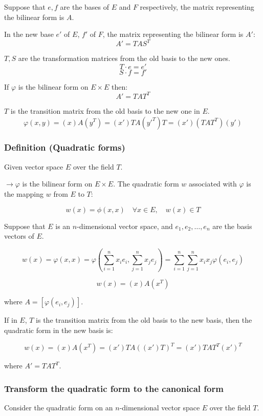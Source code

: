 Suppose that $e, f$ are the bases of $E$ and $F$ respectively, the matrix representing the bilinear form is $A$.

In the new base $e'$ of $E$, $f'$ of $F$, the matrix representing the bilinear form is $A'$:
\begin{equation*}
    A' = T A S^T
\end{equation*}


$T, S$ are the transformation matrices from the old basis to the new ones.
\[
T \cdot e = e'
\]
\[
S \cdot f = f'
\]

If $\varphi$ is the bilinear form on $E \times E$ then:
\[
A' = T A T^T
\]

$T$ is the transition matrix from the old basis to the new one in $E$.
\[
\varphi(x, y) = (x) A (y^T) = (x') T A (y'^T) T = (x') (T A T^T) (y')
\]


\subsubsection{Definition (Quadratic forms)}

Given vector space $E$ over the field $T$.

$\rightarrow\varphi$ is the bilinear form on $E \times E$.
The quadratic form $w$ associated with $\varphi$ is the mapping $w$ from $E$ to $T$:

\[
w(x) = \phi(x, x) \quad \forall x \in E, \quad w(x) \in T
\]

Suppose that $E$ is an $n$-dimensional vector space, and $e_1, e_2, \ldots, e_n$ are the basis vectors of $E$.

\[
w(x) = \varphi(x, x) = \varphi\left(\sum_{i=1}^n x_i e_i, \sum_{j=1}^n x_j e_j\right) = \sum_{i=1}^n \sum_{j=1}^n x_i x_j \varphi(e_i, e_j)
\]

\[
w(x) = (x) A (x^T)
\]

where $A = [\varphi(e_i, e_j)]$.

If in $E$, $T$ is the transition matrix from the old basis to the new basis, then the quadratic form in the new basis is:

\[
w(x) = (x) A (x^T) = (x')T A ((x')T)^T = (x')T AT^T (x')^T
\]

where $A' = T A T^T$.


\subsubsection{Transform the quadratic form to the canonical form}

Consider the quadratic form on an $n$-dimensional vector space $E$ over the field $T$.

